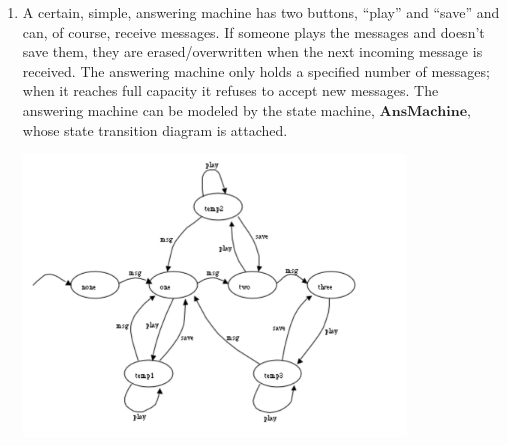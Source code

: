 \documentclass{article}
\begin{document}

\begin{enumerate}

\item A certain, simple, answering machine has two buttons, ``play''
and ``save'' and can, of course, receive messages. If someone plays
the messages and doesn't save them, they are erased/overwritten when
the next incoming message is received. The answering machine only
holds a specified number of messages; when it reaches full capacity
it refuses to accept new messages. The answering machine can be
modeled by the state machine, $\mathbf{AnsMachine}$, whose state
transition diagram is attached.

\includegraphics[width=4in]{ansmachine.png}


\end{enumerate}
\end{document}
